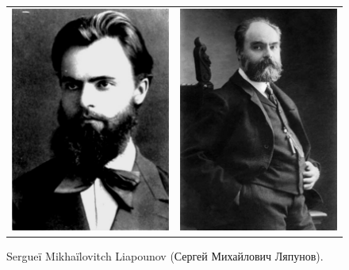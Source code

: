 \begin{figure}[!ht]
  \begin{bigcenter}
    \begin{tabular}{lr}
      \includegraphics[width=7cm, keepaspectratio]{lyapunov-1.jpg}
      &
      \includegraphics[width=7cm, keepaspectratio]{lyapunov-2.jpg}
    \end{tabular}
  \end{bigcenter}
  \caption{Sergueï Mikhaïlovitch Liapounov (\foreignlanguage{russian}{Сергей Михайлович Ляпунов}).}
\end{figure}

